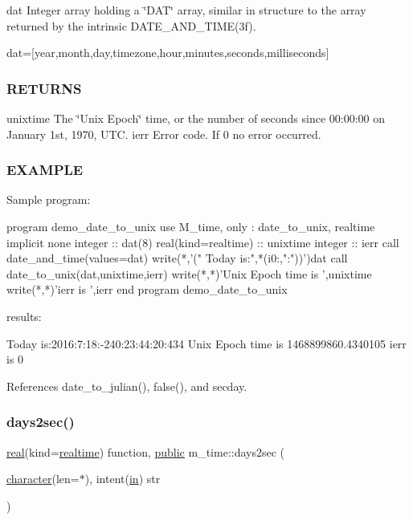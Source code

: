 dat Integer array holding a \char`\"{}\+D\+A\+T\char`\"{} array, similar in structure to the array returned by the intrinsic D\+A\+T\+E\+\_\+\+A\+N\+D\+\_\+\+T\+I\+M\+E(3f).

dat=\mbox{[}year,month,day,timezone,hour,minutes,seconds,milliseconds\mbox{]} \subsubsection*{R\+E\+T\+U\+R\+NS}

unixtime The \char`\"{}\+Unix Epoch\char`\"{} time, or the number of seconds since 00\+:00\+:00 on January 1st, 1970, U\+TC. ierr Error code. If 0 no error occurred.

\subsubsection*{E\+X\+A\+M\+P\+LE}

\begin{DoxyVerb}Sample program:

 program demo_date_to_unix
 use M_time, only : date_to_unix, realtime
 implicit none
 integer             :: dat(8)
 real(kind=realtime) :: unixtime
 integer             :: ierr
    call date_and_time(values=dat)
    write(*,'(" Today is:",*(i0:,":"))')dat
    call date_to_unix(dat,unixtime,ierr)
    write(*,*)'Unix Epoch time is ',unixtime
    write(*,*)'ierr is ',ierr
 end program demo_date_to_unix

results:

 Today is:2016:7:18:-240:23:44:20:434
 Unix Epoch time is    1468899860.4340105
 ierr is            0 \end{DoxyVerb}
 

References date\+\_\+to\+\_\+julian(), false(), and secday.

\mbox{\label{namespacem__time_a99393c7906f1989f90ece03969224938}} 
\subsubsection{\texorpdfstring{days2sec()}{days2sec()}}
{\footnotesize\ttfamily \hyperlink{read__watch_83_8txt_abdb62bde002f38ef75f810d3a905a823}{real}(kind=\hyperlink{namespacem__time_ac10ea9e8d59ec74eaa7d89f2517d7422}{realtime}) function, \hyperlink{M__stopwatch_83_8txt_a2f74811300c361e53b430611a7d1769f}{public} m\+\_\+time\+::days2sec (\begin{DoxyParamCaption}\item[{\hyperlink{option__stopwatch_83_8txt_abd4b21fbbd175834027b5224bfe97e66}{character}(len=$\ast$), intent(\hyperlink{M__journal_83_8txt_afce72651d1eed785a2132bee863b2f38}{in})}]{str }\end{DoxyParamCaption})}



